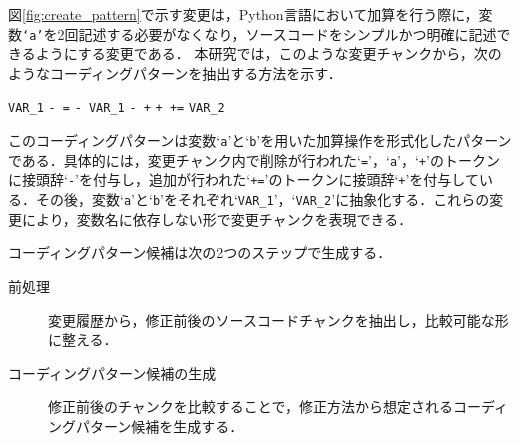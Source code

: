 \documentclass[11pt]{jreport}
\begin{document}
図\ref{fig:create_pattern}で示す変更は，Python言語において加算を行う際に，変数\texttt{`a'}を2回記述する必要がなくなり，ソースコードをシンプルかつ明確に記述できるようにする変更である．
本研究では，このような変更チャンクから，次のようなコーディングパターンを抽出する方法を示す．

\colorbox{lightgray!50}{\texttt{VAR\_1}} \colorbox{lightgray!50}{\texttt{- =}} \colorbox{lightgray!50}{\texttt{- VAR\_1}} \colorbox{lightgray!50}{\texttt{- +}} \colorbox{lightgray!50}{\texttt{+ +=}} \colorbox{lightgray!50}{\texttt{VAR\_2}}

このコーディングパターンは変数`\texttt{a}'と`\texttt{b}'を用いた加算操作を形式化したパターンである．具体的には，変更チャンク内で削除が行われた`\texttt{=}'，`\texttt{a}'，`\texttt{+}'のトークンに接頭辞`\texttt{-}'を付与し，追加が行われた`\texttt{+=}'のトークンに接頭辞`\texttt{+}'を付与している．その後，変数`\texttt{a}'と`\texttt{b}'をそれぞれ`\texttt{VAR\_1}'，`\texttt{VAR\_2}'に抽象化する．これらの変更により，変数名に依存しない形で変更チャンクを表現できる．

コーディングパターン候補は次の2つのステップで生成する．
\begin{description}
    \item[前処理] 変更履歴から，修正前後のソースコードチャンクを抽出し，比較可能な形に整える．
    \item[コーディングパターン候補の生成] 修正前後のチャンクを比較することで，修正方法から想定されるコーディングパターン候補を生成する．
\end{description}

\end{document}
